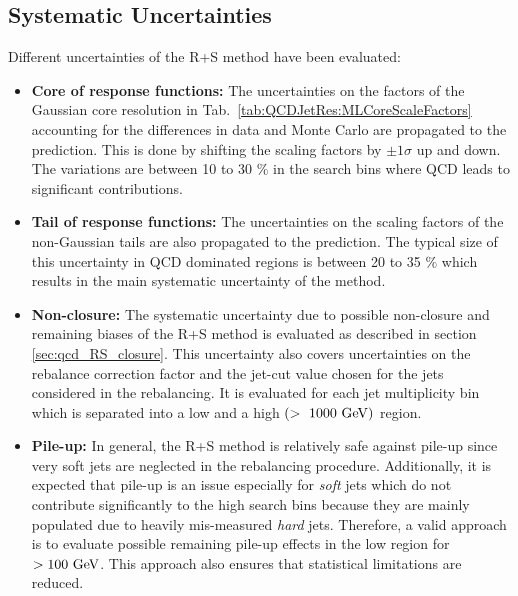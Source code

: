 \subsection{Systematic Uncertainties}
\label{subsec:RA2_syst_unc}
Different uncertainties of the R+S method have been evaluated:
\begin{itemize}
\item \textbf{Core of response functions:} The uncertainties on the factors of the Gaussian core resolution in Tab.~\ref{tab:QCDJetRes:MLCoreScaleFactors} accounting for the differences in data and Monte Carlo are propagated to the prediction. This is done by shifting the scaling factors by $\pm 1\sigma$ up and down. The variations are between 10 to 30 $\%$ in the search bins where QCD leads to significant contributions.
\item \textbf{Tail of response functions:} The uncertainties on the scaling factors of the non-Gaussian tails are also propagated to the prediction. The typical size of this uncertainty in QCD dominated regions is between 20 to 35 $\%$ which results in the main systematic uncertainty of the method. 
\item \textbf{Non-closure:} The systematic uncertainty due to possible non-closure and remaining biases of the R+S method is evaluated as described in section \ref{sec:qcd_RS_closure}. This uncertainty also covers uncertainties on the rebalance correction factor and the jet-\pt cut value chosen for the jets considered in the rebalancing. It is evaluated for each jet multiplicity bin which is separated into a low and a high \HT $(>~1000~\rm{GeV})$ region.
\item \textbf{Pile-up:} In general, the R+S method is relatively safe against pile-up since very soft jets are neglected in the rebalancing procedure. Additionally, it is expected that pile-up is an issue especially for \textit{soft} jets which do not contribute significantly to the high \MHT search bins because they are mainly populated due to heavily mis-measured \textit{hard} jets. Therefore, a valid approach is to evaluate possible remaining pile-up effects in the low \MHT region for \MHT $> 100 \rm{~GeV}$. This approach also ensures that statistical limitations are reduced.\\

\end{itemize}
